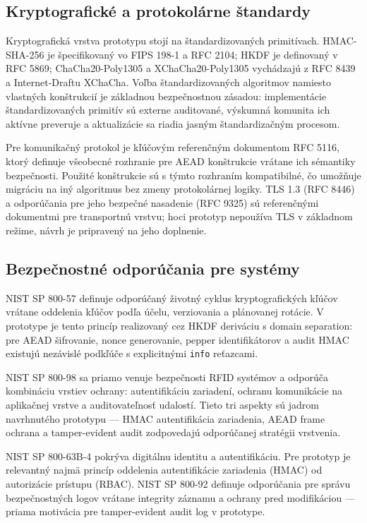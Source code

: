 \documentclass[journal,a4paper,onecolumn]{IEEEtran}
\begin{document}
\subsection{Kryptografické a protokolárne štandardy}

Kryptografická vrstva prototypu stojí na štandardizovaných primitívach. HMAC-SHA-256 je špecifikovaný vo FIPS 198-1\cite{FIPS1981} a RFC 2104\cite{RFC2104}; HKDF je definovaný v RFC 5869\cite{RFC5869}; ChaCha20-Poly1305 a XChaCha20-Poly1305 vychádzajú z RFC 8439\cite{RFC8439} a Internet-Draftu XChaCha\cite{XChaChaDraft}. Voľba štandardizovaných algoritmov namiesto vlastných konštrukcií je základnou bezpečnostnou zásadou: implementácie štandardizovaných primitív sú externe auditované, výskumná komunita ich aktívne preveruje a aktualizácie sa riadia jasným štandardizačným procesom.

Pre komunikačný protokol je kľúčovým referenčným dokumentom RFC 5116\cite{RFC5116}, ktorý definuje všeobecné rozhranie pre AEAD konštrukcie vrátane ich sémantiky bezpečnosti. Použité konštrukcie sú s týmto rozhraním kompatibilné, čo umožňuje migráciu na iný algoritmus bez zmeny protokolárnej logiky. TLS 1.3 (RFC 8446)\cite{RFC8446} a odporúčania pre jeho bezpečné nasadenie (RFC 9325)\cite{RFC9325} sú referenčnými dokumentmi pre transportnú vrstvu; hoci prototyp nepoužíva TLS v základnom režime, návrh je pripravený na jeho doplnenie.

\subsection{Bezpečnostné odporúčania pre systémy}

NIST SP 800-57\cite{NIST80057} definuje odporúčaný životný cyklus kryptografických kľúčov vrátane oddelenia kľúčov podľa účelu, verziovania a plánovanej rotácie. V prototype je tento princíp realizovaný cez HKDF deriváciu s domain separation: pre AEAD šifrovanie, nonce generovanie, pepper identifikátorov a audit HMAC existujú nezávislé podkľúče s explicitnými \texttt{info} reťazcami.

NIST SP 800-98\cite{NIST80098} sa priamo venuje bezpečnosti RFID systémov a odporúča kombináciu vrstiev ochrany: autentifikáciu zariadení, ochranu komunikácie na aplikačnej vrstve a auditovateľnosť udalostí. Tieto tri aspekty sú jadrom navrhnutého prototypu --- HMAC autentifikácia zariadenia, AEAD frame ochrana a tamper-evident audit zodpovedajú odporúčanej stratégii vrstvenia.

NIST SP 800-63B-4\cite{NIST80063B4} pokrýva digitálnu identitu a autentifikáciu. Pre prototyp je relevantný najmä princíp oddelenia autentifikácie zariadenia (HMAC) od autorizácie prístupu (RBAC). NIST SP 800-92\cite{NIST80092} definuje odporúčania pre správu bezpečnostných logov vrátane integrity záznamu a ochrany pred modifikáciou --- priama motivácia pre tamper-evident audit log v prototype.
\end{document}
